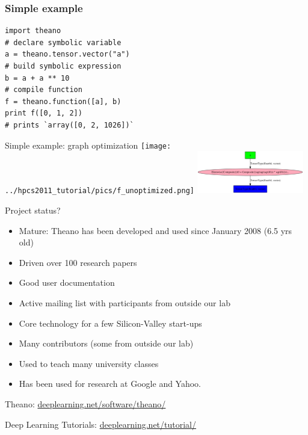 \documentclass[utf8x,xcolor=pdftex,dvipsnames,table]{beamer}
\begin{document}
\begin{frame}[fragile]
  \frametitle{Simple example}

\begin{lstlisting}
import theano
# declare symbolic variable
a = theano.tensor.vector("a")
# build symbolic expression
b = a + a ** 10
# compile function
f = theano.function([a], b)
print f([0, 1, 2])
# prints `array([0, 2, 1026])`
\end{lstlisting}
\end{frame}

\begin{frame}{Simple example: graph optimization}
\center
\texttt{[image: ../hpcs2011\_tutorial/pics/f\_unoptimized.png]}
\hspace{0.1\textwidth}
\includegraphics[width=0.35\textwidth]{../hpcs2011_tutorial/pics/f_optimized.png}

\end{frame}


\begin{frame}{Project status?}
  \begin{itemize}
    \item Mature: Theano has been developed and used since January 2008 (6.5 yrs old)
    \item Driven over 100 research papers
    \item Good user documentation
    \item Active mailing list with participants from outside our lab
    \item Core technology for a few Silicon-Valley start-ups
    \item Many contributors (some from outside our lab)
    \item Used to teach many university classes
    \item Has been used for research at Google and Yahoo.
  \end{itemize}
  Theano: \url{deeplearning.net/software/theano/}

  Deep Learning Tutorials: \url{deeplearning.net/tutorial/}
\end{frame}
\end{document}
